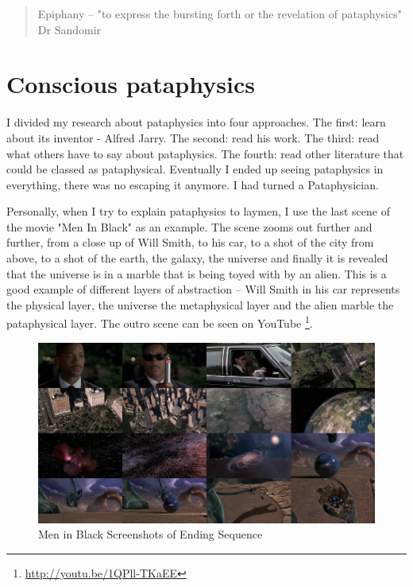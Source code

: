\begin{quote}
  Epiphany – "to express the bursting forth or the revelation of pataphysics" Dr Sandomir \citep[p.174]{Hugill2012a}
\end{quote}

\section{Conscious pataphysics}

I divided my research about pataphysics into four approaches. The first: learn about its inventor - Alfred Jarry. The second: read his work. The third: read what others have to say about pataphysics. The fourth: read other literature that could be classed as pataphysical. Eventually I ended up seeing pataphysics in everything, there was no escaping it anymore. I had turned a Pataphysician.

Personally, when I try to explain pataphysics to laymen, I use the last scene of the movie "Men In Black" as an example. The scene zooms out further and further, from a close up of Will Smith, to his car, to a shot of the city from above, to a shot of the earth, the galaxy, the universe and finally it is revealed that the universe is in a marble that is being toyed with by an alien. This is a good example of different layers of abstraction – Will Smith in his car represents the physical layer, the universe the metaphysical layer and the alien marble the pataphysical layer. The outro scene can be seen on YouTube \footnote{\url{http://youtu.be/1QPll-TKaEE}}.

\begin{figure}[htb] %
  \centering
  \includegraphics[width=\linewidth]{images/mib}
  \caption[Men in Black]{Men in Black Screenshots of Ending Sequence}
  \label{fig:MIB}
\end{figure}

